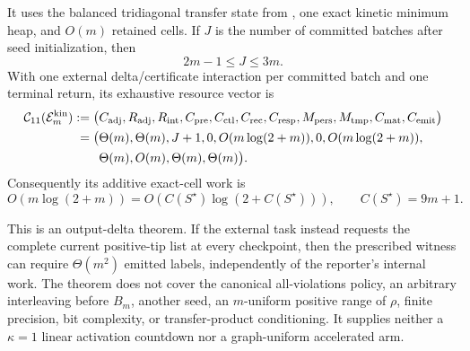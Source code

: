\begin{theorem}
It uses the balanced tridiagonal transfer state from
, one exact kinetic
minimum heap, and $O(m)$ retained cells.  If $J$ is the number of committed
batches after seed initialization, then
\begin{equation*}
 2m-1\leq J\leq3m.
\end{equation*}
With one external delta/certificate interaction per committed batch and one
terminal return, its exhaustive resource vector is
\begin{equation}
 \begin{aligned}
 \mathcal C_{11}(\mathcal E_m^{\rm kin})
 :=\bigl(&C_{\rm adj},R_{\rm adj},R_{\rm int},C_{\rm pre},C_{\rm ctl},
 C_{\rm rec},C_{\rm resp},M_{\rm pers},M_{\rm tmp},C_{\rm mat},C_{\rm emit}
 \bigr)\\
 =\bigl(&\Theta(m),\Theta(m),J+1,0,
 O(m\log(2+m)),0,O(m\log(2+m)),\\
 &\Theta(m),O(m),\Theta(m),\Theta(m)\bigr).
 \end{aligned}
 \label{eq:branch-caterpillar-kinetic-eleven-vector}
\end{equation}
Consequently its additive exact-cell work is
\begin{equation}
 O(m\log(2+m))
 =O\!\left(C(S^\star)\log(2+C(S^\star))\right),
 \qquad C(S^\star)=9m+1.
 \label{eq:branch-caterpillar-kinetic-total}
\end{equation}

This is an output-delta theorem.  If the external task instead requests the
complete current positive-tip list at every checkpoint, then the prescribed
witness can require $\Theta(m^2)$ emitted labels, independently of the
reporter's internal work.  The theorem does not cover the canonical
all-violations policy, an arbitrary interleaving before $B_m$, another seed,
an $m$-uniform positive range of $\rho$, finite precision, bit complexity,
or transfer-product conditioning.  It supplies neither a $\kappa=1$ linear
activation countdown nor a graph-uniform accelerated arm.
\end{theorem}

